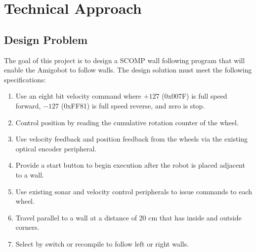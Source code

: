 \section{Technical Approach}
\subsection{Design Problem}
The goal of this project is to design a SCOMP wall following program
that will enable the Amigobot to follow walls. The design solution 
must meet the following specifications: 
\begin{enumerate}
\item Use an eight bit velocity command where \(+127\) (0x007F) is
  full speed forward, \(-127\) (0xFF81) is full speed reverse, and
  zero is stop.
\item Control position by reading the cumulative rotation counter of
  the wheel.
\item Use velocity feedback and position feedback from the wheels via
  the existing optical encoder peripheral.
\item Provide a start button to begin execution after the robot is
  placed adjacent to a wall.
\item Use existing sonar and velocity control peripherals to issue
  commands to each wheel.
\item Travel parallel to a wall at a distance of 20 cm that has inside
  and outside corners.
\item Select by switch or recompile to follow left or right walls.
\end{enumerate}

\begin{figure}[h!]
\centering
\cprotect {}
\end{figure}

